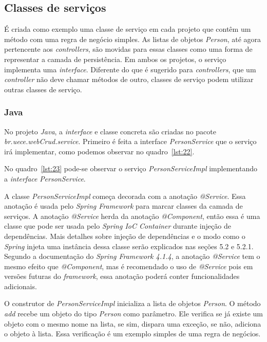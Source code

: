 \documentclass[a4paper,12pt]{article}
\newcommand{\est}[1] {
\textit{#1}}
\newcommand{\classe}[1] {
\textit{#1}}
\newcommand{\lang}[1] {
\textit{#1}}
\newcommand{\annotation}[1] {
\textit{#1}}
\newcommand{\pacote}[1] {
\textit{#1}}
\newcommand{\metodo}[1] {
\textit{#1}}
\newcommand{\javacode}[3] {
	
}
\begin{document}
\subsection{Classes de serviços}

É criada como exemplo uma classe de serviço em cada projeto que contêm um método com uma regra de negócio simples. As listas de objetos \classe{Person}, até agora pertencente aos \est{controllers}, são movidas para essas classes como uma forma de representar a camada de persistência. Em ambos os projetos, o serviço implementa uma \est{interface}. Diferente do que é sugerido para \est{controllers}, que um \est{controller} não deve chamar métodos de outro, classes de serviço podem utilizar outras classes de serviço.

\subsubsection{Java}

No projeto \lang{Java}, a \est{interface} e classe concreta são criadas no pacote \pacote{br.uece.webCrud.service}. Primeiro é feita a interface \classe{PersonService} que o serviço irá implementar, como podemos observar no quadro~\ref{lst:22}.

\javacode{code/22.txt}{\est{Interface} \classe{PersonService}}{lst:22}

No quadro~\ref{lst:23} pode-se observar o serviço \classe{PersonServiceImpl} implementando a \est{interface} \classe{PersonService}.

\javacode{code/23.txt}{Classe \classe{PersonServiceImpl}}{lst:23}

A classe \classe{PersonServiceImpl} começa decorada com a anotação \annotation{@Service}. Essa anotação é usada pelo \est{Spring Framework} para marcar classes da camada de serviços. A anotação \annotation{@Service} herda da anotação \annotation{@Component}, então essa é uma classe que pode ser usada pelo \est{Spring IoC Container} durante injeção de dependências. Mais detalhes sobre injeção de dependências e o modo como o \est{Spring} injeta uma instância dessa classe serão explicados nas seções 5.2 e 5.2.1. Segundo a documentação do \est{Spring Framework 4.1.4}, a anotação \annotation{@Service} tem o mesmo efeito que \annotation{@Component}, mas é recomendado o uso de \annotation{@Service} pois em versões futuras do \est{framework}, essa anotação poderá conter funcionalidades adicionais.

O construtor de \classe{PersonServiceImpl} inicializa a lista de objetos \classe{Person}. O método \metodo{add} recebe um objeto do tipo \classe{Person} como parâmetro. Ele verifica se já existe um objeto com o mesmo nome na lista, se sim, dispara uma exceção, se não, adiciona o objeto à lista. Essa verificação é um exemplo simples de uma regra de negócios.
\end{document}

